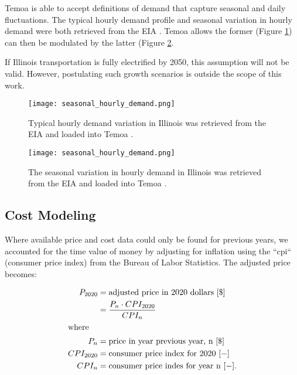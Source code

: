 Temoa is able to accept definitions of demand that capture seasonal and daily 
fluctuations. The typical hourly demand profile and seasonal variation in 
hourly demand were both retrieved from the \gls{EIA} 
\cite{us_energy_information_administration_eia_illinois_2020}.  
Temoa allows the former 
(Figure \ref{fig:hourly_demand}) can then be 
modulated by the latter (Figure \ref{fig:seasonal_hourly_demand}. 

If Illinois transportation is fully electrified by 2050, this assumption will
not be valid.  However, postulating such growth scenarios is outside the scope
of this work. 

\begin{figure}[htbp!]
\begin{center}
\texttt{[image: seasonal\_hourly\_demand.png]}
\end{center}
        \caption{Typical hourly demand variation in Illinois was retrieved from the \gls{EIA}
        \cite{us_energy_information_administration_eia_illinois_2020} and 
        loaded into Temoa \cite{decarolis_modelling_2016}.}
\label{fig:hourly_demand}
\end{figure}


\begin{figure}[htbp!]
        \begin{center}
               \texttt{[image: seasonal\_hourly\_demand.png]}
        \end{center}
        \caption{The seasonal variation in hourly demand in Illinois was retrieved from the \gls{EIA} 
        \cite{us_energy_information_administration_eia_illinois_2020} and 
        loaded into Temoa \cite{decarolis_modelling_2016}.}
        \label{fig:seasonal_hourly_demand}
\end{figure}

\subsection{Cost Modeling}
Where available price and cost data could only be found for previous years, we 
                accounted for the time value of money by adjusting for 
                inflation using the ``cpi`` (consumer price index) from the 
                Bureau of Labor Statistics. The adjusted price becomes: 

\begin{align}
        P_{2020} &= \mbox{adjusted price in 2020 dollars }[\$]\\
                &= \frac{P_{n} \cdot CPI_{2020}}{CPI_{n}}\\
        \intertext{where}
        P_n &= \mbox{price in year previous year, n } [\$]\\
        CPI_{2020} &= \mbox{consumer price index for 2020 } [-]\\
        CPI_n &= \mbox{consumer price indes for year n } [-].
\end{align}


